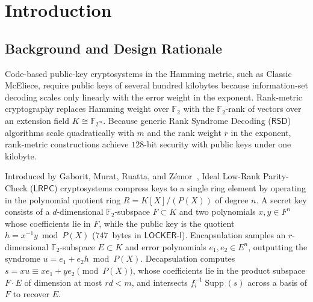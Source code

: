 \documentclass[11pt,a4paper]{article}
\theoremstyle{definition}
\theoremstyle{remark}
\newcommand{\F}{\mathbb{F}}
\newcommand{\Ftwo}{\mathbb{F}_2}
\newcommand{\Supp}{\operatorname{Supp}}
\begin{document}
\section{Introduction}
\label{sec:intro}

\subsection{Background and Design Rationale}
Code-based public-key cryptosystems in the Hamming metric, such as Classic McEliece, require public keys of several hundred kilobytes because information-set decoding scales only linearly with the error weight in the exponent. Rank-metric cryptography replaces Hamming weight over $\Ftwo$ with the $\Ftwo$-rank of vectors over an extension field $K \cong \F_{2^m}$. Because generic Rank Syndrome Decoding ($\mathsf{RSD}$) algorithms scale quadratically with $m$ and the rank weight $r$ in the exponent, rank-metric constructions achieve $128$-bit security with public keys under one kilobyte.

Introduced by Gaborit, Murat, Ruatta, and Z\'{e}mor~\cite{GMRZ13}, Ideal Low-Rank Parity-Check ($\mathsf{LRPC}$) cryptosystems compress keys to a single ring element by operating in the polynomial quotient ring $R = K[X]/(P(X))$ of degree $n$. A secret key consists of a $d$-dimensional $\Ftwo$-subspace $F \subset K$ and two polynomials $x, y \in F^n$ whose coefficients lie in $F$, while the public key is the quotient $h = x^{-1} y \bmod P(X)$ ($747$~bytes in $\mathsf{LOCKER\text{-}I}$). Encapsulation samples an $r$-dimensional $\Ftwo$-subspace $E \subset K$ and error polynomials $e_1, e_2 \in E^n$, outputting the syndrome $u = e_1 + e_2 h \bmod P(X)$. Decapsulation computes $s = x u \equiv x e_1 + y e_2 \pmod{P(X)}$, whose coefficients lie in the product subspace $F \cdot E$ of dimension at most $r d < m$, and intersects $f_i^{-1}\Supp(s)$ across a basis of $F$ to recover $E$.
\end{document}
